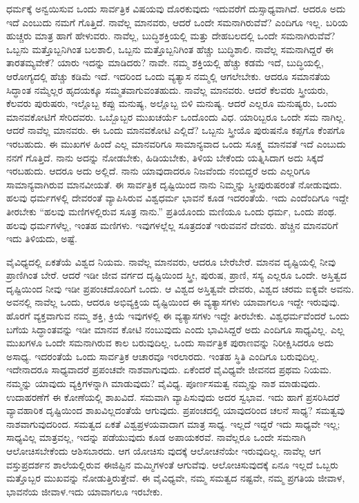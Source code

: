 ಧರ್ಮಕ್ಕೆ ಅನ್ವಯಿಸುವ ಒಂದು ಸಾರ್ವತ್ರಿಕ ವಿಷಯವು ದೊರಕುವುದು ಇದುವರೆಗೆ ದುಸ್ಸಾಧ್ಯವಾಗಿದೆ. ಆದರೂ ಅದು ಇದೆ ಎಂಬುದು ನಮಗೆ ಗೊತ್ತಿದೆ. ನಾವೆಲ್ಲ ಮಾನವರು, ಆದರೆ ಒಂದೇ ಸಮನಾಗಿರುವೆವೆ? ಎಂದಿಗೂ ಇಲ್ಲ. ಬರಿಯ ಹುಚ್ಚರು ಮಾತ್ರ ಹಾಗೆ ಹೇಳುವರು. ನಾವೆಲ್ಲ, ಬುದ್ಧಿಶಕ್ತಿಯಲ್ಲಿ ಮತ್ತು ದೇಹಬಲದಲ್ಲಿ ಒಂದೇ ಸಮನಾಗಿರುವೆವೆ? ಒಬ್ಬನು ಮತ್ತೊಬ್ಬನಿಗಿಂತ ಬಲಶಾಲಿ, ಒಬ್ಬನು ಮತ್ತೊಬ್ಬನಿಗಿಂತ ಹೆಚ್ಚು ಬುದ್ಧಿಶಾಲಿ. ನಾವೆಲ್ಲ ಸಮನಾಗಿದ್ದರೆ ಈ ತಾರತಮ್ಯವೇಕೆ? ಯಾರು ಇದನ್ನು ಮಾಡಿದರು? ನಾವೇ. ನಮ್ಮ ಶಕ್ತಿಯಲ್ಲಿ ಹೆಚ್ಚು ಕಡಮೆ ಇದೆ, ಬುದ್ಧಿಯಲ್ಲಿ, ಆರೋಗ್ಯದಲ್ಲಿ ಹೆಚ್ಚು ಕಡಿಮೆ ಇದೆ. ಇದರಿಂದ ಒಂದು ವ್ಯತ್ಯಾಸ ನಮ್ಮಲ್ಲಿ ಆಗಲೇಬೇಕು. ಆದರೂ ಸಮಾನತೆಯ ಸಿದ್ಧಾಂತ ನಮ್ಮೆಲ್ಲರ ಹೃದಯಕ್ಕೂ ಸಮ್ಮತವಾಗುವಂತಹುದು. ನಾವೆಲ್ಲ ಮಾನವರು. ಆದರೆ ಕೆಲವರು ಸ್ತ್ರೀಯರು, ಕೆಲವರು ಪುರುಷರು, ಇಲ್ಲೊಬ್ಬ ಕಪ್ಪು ಮನುಷ್ಯ, ಅಲ್ಲೊಬ್ಬ ಬಿಳಿ ಮನುಷ್ಯ. ಆದರೆ ಎಲ್ಲರೂ ಮನುಷ್ಯರು, ಒಂದು ಮಾನವಕೋಟಿಗೆ ಸೇರಿದವರು. ಒಬ್ಬೊಬ್ಬರ ಮುಖಚರ್ಯೆ ಒಂದೊಂದು ವಿಧ. ಯಾರಿಬ್ಬರೂ ಒಂದೇ ಸಮ ನಾಗಿಲ್ಲ. ಆದರೆ ನಾವೆಲ್ಲ ಮಾನವರು. ಈ ಒಂದು ಮಾನವಕೋಟಿ ಎಲ್ಲಿದೆ? ಒಬ್ಬನು ಸ್ತ್ರೀಯೊ ಪುರುಷನೊ ಕಪ್ಪಗೊ ಕೆಂಪಗೊ ಇರಬಹುದು. ಈ ಮುಖಗಳ ಹಿಂದೆ ಎಲ್ಲ ಮಾನವರಿಗೂ ಸಾಮಾನ್ಯವಾದ ಒಂದು ಸೂಕ್ಷ್ಮ ಮಾನವತೆ ಇದೆ ಎಂಬುದು ನನಗೆ ಗೊತ್ತಿದೆ. ನಾನು ಅದನ್ನು ನೋಡಬೇಕು, ಹಿಡಿಯಬೇಕು, ತಿಳಿಯ ಬೇಕೆಂದು ಯತ್ನಿಸಿದಾಗ ಅದು ಸಿಕ್ಕದೆ ಇರಬಹುದು. ಆದರೂ ಅದು ಅಲ್ಲಿದೆ. ನಾನು ಯಾವುದಾದರೂ ನಿಜವೆಂದು ನಂಬಿದ್ದರೆ ಅದು ಎಲ್ಲರಿಗೂ ಸಾಮಾನ್ಯವಾಗಿರುವ ಮಾನವೀಯತೆ. ಈ ಸಾರ್ವತ್ರಿಕ ದೃಷ್ಟಿಯಿಂದ ನಾನು ನಿಮ್ಮನ್ನು ಸ್ತ್ರೀಪುರುಷರಂತೆ ನೋಡುವುದು. ಹಲವು ಧರ್ಮಗಳಲ್ಲಿ ದೇವರಂತೆ ವ್ಯಾಪಿಸಿರುವ ವಿಶ್ವಧರ್ಮ ಭಾವನೆ ಕೂಡ ಇದರಂತೆಯೆ. ಇದು ಎಂದೆಂದಿಗೂ ಇದ್ದೇ ತೀರಬೇಕು “ಹಲವು ಮಣಿಗಳಲ್ಲಿರುವ ಸೂತ್ರ ನಾನು.” ಪ್ರತಿಯೊಂದು ಮಣಿಯೂ ಒಂದು ಧರ್ಮ, ಒಂದು ಪಂಥ. ಹಲವು ಧರ್ಮಗಳೆಲ್ಲ, ಇಂತಹ ಮಣಿಗಳು. ಇವುಗಳಲ್ಲೆಲ್ಲ ಸೂತ್ರದಂತೆ ಇರುವವನೆ ದೇವರು. ಹೆಚ್ಚಿನ ಮಾನವರಿಗೆ ಇದು ತಿಳಿಯದು, ಅಷ್ಟೆ.

ವೈವಿಧ್ಯದಲ್ಲಿ ಏಕತೆಯೆ ವಿಶ್ವದ ನಿಯಮ. ನಾವೆಲ್ಲ ಮಾನವರು, ಆದರೂ ಬೇರೆಬೇರೆ. ಮಾನವ ದೃಷ್ಟಿಯಲ್ಲಿ ನೀವು ಪ್ರಾಣಿಗಿಂತ ಬೇರೆ. ಆದರೆ ಇಡೀ ಜೀವ ವರ್ಗದ ದೃಷ್ಟಿಯಿಂದ ಸ್ತ್ರೀ, ಪುರುಷ, ಪ್ರಾಣಿ, ಸಸ್ಯ ಎಲ್ಲರೂ ಒಂದೇ. ಅಸ್ತಿತ್ವದ ದೃಷ್ಟಿಯಿಂದ ನೀವು ಇಡೀ ಪ್ರಪಂಚದೊಂದಿಗೆ ಒಂದು. ಆ ವಿಶ್ವದ ಅಸ್ತಿತ್ವವೇ ದೇವರು, ವಿಶ್ವದ ಚರಮ ಐಕ್ಯವೇ ಅವನು. ಅವನಲ್ಲಿ ನಾವೆಲ್ಲ ಒಂದು, ಆದರೂ ಅಭಿವ್ಯಕ್ತಿಯ ದೃಷ್ಟಿಯಿಂದ ಈ ವ್ಯತ್ಯಾಸಗಳು ಯಾವಾಗಲೂ ಇದ್ದೇ ಇರುವುವು. ಹೊರಗೆ ವ್ಯಕ್ತವಾಗುವ ನಮ್ಮ ಶಕ್ತಿ, ಕ್ರಿಯೆ ಇವುಗಳಲ್ಲಿ ಈ ವ್ಯತ್ಯಾಸಗಳು ಇದ್ದೇ ತೀರಬೇಕು. ವಿಶ್ವಧರ್ಮವೆಂದರೆ ಒಂದು ಬಗೆಯ ಸಿದ್ಧಾಂತವನ್ನು ಇಡೀ ಮಾನವ ಕೋಟಿ ನಂಬುವುದು ಎಂದು ಭಾವಿಸಿದ್ದರೆ ಅದು ಎಂದಿಗೂ ಸಾಧ್ಯವಿಲ್ಲ. ಎಲ್ಲ ಮುಖಗಳೂ ಒಂದೇ ಸಮನಾಗಿರುವ ಕಾಲ ಬರುವುದಿಲ್ಲ. ಒಂದು ಸಾರ್ವತ್ರಿಕ ಪುರಾಣವನ್ನು ನಿರೀಕ್ಷಿಸಿದರೂ ಅದು ಅಸಾಧ್ಯ. ಇದರಂತೆಯೆ ಒಂದು ಸಾರ್ವತ್ರಿಕ ಆಚಾರವೂ ಇರಲಾರದು. ಇಂತಹ ಸ್ಥಿತಿ ಎಂದಿಗೂ ಬರುವುದಿಲ್ಲ. ಇದೇನಾದರೂ ಸಾಧ್ಯವಾದರೆ ಪ್ರಪಂಚವೇ ನಾಶವಾಗುವುದು. ಏಕೆಂದರೆ ವೈವಿಧ್ಯವೇ ಜೀವನದ ಪ್ರಥಮ ನಿಯಮ. ನಮ್ಮನ್ನು ಯಾವುದು ವ್ಯಕ್ತಿಗಳನ್ನಾಗಿ ಮಾಡುವುದು? ವೈವಿಧ್ಯ. ಪೂರ್ಣಸಮತ್ವ ನಮ್ಮನ್ನು ನಾಶ ಮಾಡುವುದು. ಉದಾಹರಣೆಗೆ ಈ ಕೋಣೆಯಲ್ಲಿ ಶಾಖವಿದೆ. ಸಮವಾಗಿ ವ್ಯಾಪಿಸುವುದು ಅದರ ಸ್ವಭಾವ. ಇದು ಹಾಗೆ ಪ್ರಸರಿಸಿದರೆ ವ್ಯಾವಹಾರಿಕ ದೃಷ್ಟಿಯಿಂದ ಶಾಖವಿಲ್ಲದಂತೆಯೆ ಆಗುವುದು. ಪ್ರಪಂಚದಲ್ಲಿ ಯಾವುದರಿಂದ ಚಲನೆ ಸಾಧ್ಯ? ಸಮತ್ವವು ನಾಶವಾಗುವುದರಿಂದ. ಸಮತ್ವದ ಏಕತೆ ವಿಶ್ವಪ್ರಳಯವಾದಾಗ ಮಾತ್ರ ಸಾಧ್ಯ. ಇಲ್ಲದೆ ಇದ್ದರೆ ಇದು ಸಾಧ್ಯವೇ ಇಲ್ಲ; ಸಾಧ್ಯವಿಲ್ಲ ಮಾತ್ರವಲ್ಲ, ಇದನ್ನು ಪಡೆಯುವುದು ಕೂಡ ಅಪಾಯಕರವೆ. ನಾವೆಲ್ಲರೂ ಒಂದೇ ಸಮನಾಗಿ ಆಲೋಚಿಸಬೇಕೆಂದು ಆಶಿಸಬಾರದು. ಆಗ ಯೋಚಿಸು ವುದಕ್ಕೆ ಆಲೋಚನೆಯೇ ಇರುವುದಿಲ್ಲ. ನಾವೆಲ್ಲ ಆಗ ವಸ್ತುಪ್ರದರ್ಶನ ಶಾಲೆಯಲ್ಲಿರುವ ಈಜಿಪ್ಟಿನ ಮಮ್ಮಿಗಳಂತೆ ಆಗುವೆವು. ಆಲೋಚಿಸುವುದಕ್ಕೆ ಏನೂ ಇಲ್ಲದೆ ಒಬ್ಬರು ಮತ್ತೊಬ್ಬರ ಮುಖವನ್ನು ನೋಡುತ್ತಿರುತ್ತೇವೆ. ಈ ವೈವಿಧ್ಯವೇ, ನಮ್ಮ ಸಮತ್ವದ ನಷ್ಟವೇ, ನಮ್ಮ ಪ್ರಗತಿಯ ಜೀವಾಳ, ಭಾವನೆಯ ಜೀವಾಳ.ಇದು ಯಾವಾಗಲೂ ಇರಬೇಕು.

